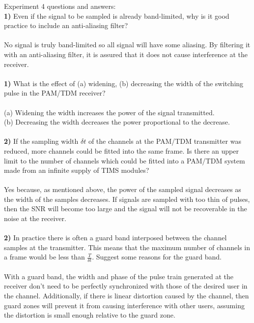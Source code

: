 \documentclass[letterpaper,11pt]{article}
\begin{document}
Experiment 4 questions and answers:\\

\textbf{1) } Even if the signal to be sampled is already band-limited, why is it good practice to include an anti-aliasing filter? \\ \\ 
No signal is truly band-limited so all signal will have some aliasing.  By filtering it with an anti-aliasing filter, it is assured that it does not cause interference at the receiver.
\\ \\
\textbf{1) }   What is the effect of (a) widening, (b) decreasing  the width of the switching pulse in the PAM/TDM receiver?\\ \\
(a) Widening the width increases the power of the signal transmitted.\\
(b) Decreasing the width decreases the power proportional to the decrease.
\\ \\
\textbf{2) } If the sampling width $\delta t$ of the channels at the PAM/TDM transmitter was reduced, more channels could be fitted into the same frame. Is there an upper limit to the number of channels which could be fitted into a PAM/TDM system made from an infinite supply of TIMS modules?\\ \\
Yes because, as mentioned above, the power of the sampled signal decreases as the width of the samples decreases.  If signals are sampled with too thin of pulses, then the SNR will become too large and the signal will not be recoverable in the noise at the receiver.
\\ \\
\textbf{2) } In practice there is often a guard band interposed between the channel samples at the transmitter. This means that the maximum number of channels in a frame would be less than $\frac{T}{\delta t}$. Suggest some reasons for the guard band.\\ \\
With a guard band, the width and phase of the pulse train generated at the receiver don't need to be perfectly synchronized with those of the desired user in the channel.  Additionally, if there is linear distortion caused by the channel, then guard zones will prevent it from causing interference with other users, assuming the distortion is small enough relative to the guard zone.
\end{document}

